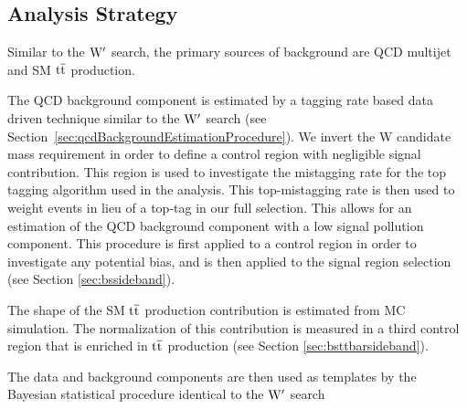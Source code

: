 \subsection{Analysis Strategy}
\label{sec:bsanalysisStrategy}
Similar to the $\mathrm{W}^{\prime}$ search, the primary sources of background are QCD multijet and SM $\mathrm{t\overline{t}}$ 
production.  

The QCD background component is estimated by a tagging rate based data driven technique similar 
to the $\mathrm{W}^{\prime}$ search (see Section~\ref{sec:qcdBackgroundEstimationProcedure}).  
We invert the W candidate mass requirement in order to define a control region with negligible signal contribution.  
This region is used to investigate the mistagging rate for the top tagging algorithm used in the analysis.  
This top-mistagging rate is then used to weight events in lieu of a top-tag in our full selection.  This allows for an estimation of the 
QCD background component with a low signal pollution component.  This procedure is first applied to a control region in order to  
investigate any potential bias, and is then applied to the signal region selection (see Section \ref{sec:bssideband}). 

The shape of the SM $\mathrm{t\overline{t}}$ production contribution is estimated from MC simulation.  The normalization of this contribution is 
measured in a third control region that is enriched in $\mathrm{t\overline{t}}$ production (see Section \ref{sec:bsttbarsideband}).

The data and background components are then used as templates by the Bayesian statistical procedure identical to the $\mathrm{W}^{\prime}$ search
